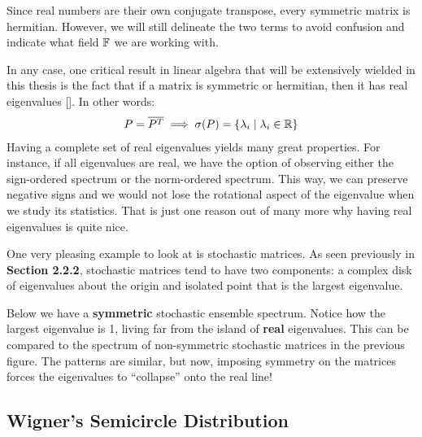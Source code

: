 \begin{remark}
Since real numbers are their own conjugate transpose, every symmetric matrix is hermitian. However, we will still delineate the two terms to avoid confusion and indicate what field $\mathbb{F}$ we are working with.
\end{remark}

In any case, one critical result in linear algebra that will be extensively wielded in this thesis is the fact that if a matrix is symmetric or hermitian, then it has real eigenvalues [\cite{horn}]. In other words:
\begin{align*}
P = \overline{P^{T}} \implies \sigma(P) = \{\lambda_i \mid \lambda_i \in \mathbb{R}\}
\end{align*}
Having a complete set of real eigenvalues yields many great properties. For instance, if all eigenvalues are real, we have the option of observing either the sign-ordered spectrum or the norm-ordered spectrum.
This way, we can preserve negative signs and we would not lose the rotational aspect of the eigenvalue when we study its statistics. That is just one reason out of many more why having real eigenvalues is quite nice.


One very pleasing example to look at is stochastic matrices.
As seen previously in \textbf{Section 2.2.2}, stochastic matrices tend to have two components: a complex disk of eigenvalues about the origin and isolated point that is the largest eigenvalue.

Below we have a \textbf{symmetric} stochastic ensemble spectrum. Notice how the largest eigenvalue is 1, living far from the island of \textbf{real} eigenvalues.
This can be compared to the spectrum of non-symmetric stochastic matrices in the previous figure.
The patterns are similar, but now, imposing symmetry on the matrices forces the eigenvalues to ``collapse'' onto the real line!


\newpage
\subsection{Wigner's Semicircle Distribution}

